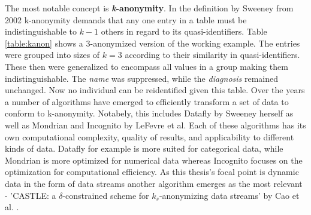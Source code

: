 The most notable concept is \textbf{\textit{k}-anonymity}. In the definition by Sweeney from 2002 \cite{sweeney2002kanonymity} k-anonymity demands that any one entry in a table must be indistinguishable to $k - 1$ others in regard to its quasi-identifiers. Table \ref{table:kanon} shows a 3-anonymized version of the working example. The entries were grouped into sizes of $k=3$ according to their similarity in quasi-identifiers. These then were generalized to encompass all values in a group making them indistinguishable. The \textit{name} was suppressed, while the \textit{diagnosis} remained unchanged. Now no individual can be reidentified given this table. Over the years a number of algorithms have emerged to efficiently transform a set of data to conform to k-anonymity. Notabely, this includes Datafly by Sweeney herself \cite{sweeney1997datafly} as well as Mondrian \cite{lefevre2006mondrian} and Incognito \cite{lefevre2005incognito} by LeFevre et al. Each of these algorithms has its own computational complexity, quality of results, and applicability to different kinds of data. Datafly for example is more suited for categorical data, while Mondrian is more optimized for numerical data whereas Incognito focuses on the optimization for computational efficiency. As this thesis's focal point is dynamic data in the form of data streams another algorithm emerges as the most relevant - 'CASTLE: a $\delta$-constrained scheme for $k_s$-anonymizing data streams' by Cao et al. \cite{Cao2008}. 

